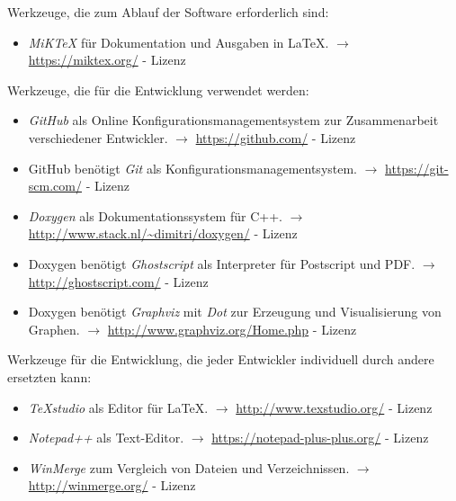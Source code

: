 \documentclass[english,ngerman,parskip=half,headsepline,footsepline]{scrreprt}
\newcounter{Enumi}
\begin{document}
	Werkzeuge, die zum Ablauf der Software erforderlich sind:
	\begin{itemize}
		
		\item\label{Werkzeug:MiKTeX}\emph{MiK\TeX} für Dokumentation und Ausgaben in \LaTeX. $\rightarrow$ \url{https://miktex.org/} - Lizenz \cite{MiKTeX}
		
		\setcounter{Enumi}{\value{enumi}}
	\end{itemize}
	
	Werkzeuge, die für die Entwicklung verwendet werden:
	\begin{itemize}
		\setcounter{enumi}{\value{Enumi}}
		
		\item\label{Werkzeug:GitHub}\emph{GitHub} als Online Konfigurationsmanagementsystem zur Zusammenarbeit verschiedener Entwickler. $\rightarrow$ \url{https://github.com/} - Lizenz \cite{GPLii}
		
		\item\label{Werkzeug:Git}GitHub benötigt \emph{Git} als Konfigurationsmanagementsystem. $\rightarrow$ \url{https://git-scm.com/} - Lizenz \cite{GPLii}
		
		\item\label{Werkzeug:Doxygen}\emph{Doxygen} als Dokumentationssystem für C++. $\rightarrow$ \url{http://www.stack.nl/~dimitri/doxygen/} - Lizenz \cite{GPLii}
		
		\item\label{Werkzeug:Ghostscript}Doxygen benötigt \emph{Ghostscript} als Interpreter für Postscript und PDF. $\rightarrow$ \url{http://ghostscript.com/} - Lizenz \cite{AGPL}
		
		\item\label{Werkzeug:Graphviz}Doxygen benötigt \emph{Graphviz} mit \emph{Dot} zur Erzeugung und Visualisierung von Graphen. $\rightarrow$ \url{http://www.graphviz.org/Home.php} - Lizenz \cite{EPL}
		
		\setcounter{Enumi}{\value{enumi}}
	\end{itemize}
	
	Werkzeuge für die Entwicklung, die jeder Entwickler individuell durch andere ersetzten kann:
	\begin{itemize}
		\setcounter{enumi}{\value{Enumi}}
		
		\item\label{Werkzeug:TeXstudio}\emph{\TeX studio} als Editor für \LaTeX. $\rightarrow$ \url{http://www.texstudio.org/} - Lizenz \cite{GPLii}
		
		\item\label{Werkzeug:Notepadpp}\emph{Notepad++} als Text-Editor. $\rightarrow$ \url{https://notepad-plus-plus.org/} - Lizenz \cite{GPLi}
		
		\item\label{Werkzeug:WinMerge}\emph{WinMerge} zum Vergleich von Dateien und Verzeichnissen. $\rightarrow$ \url{http://winmerge.org/} - Lizenz \cite{GPLi}
		
		\setcounter{Enumi}{\value{enumi}}
	\end{itemize}
	
\end{document}
